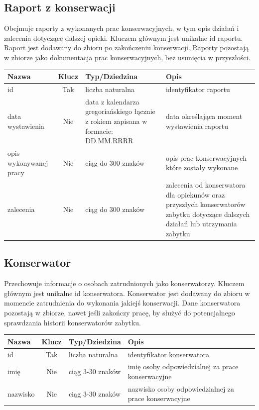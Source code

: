 \documentclass{article}
\begin{document}
\subsection*{Raport z konserwacji}
Obejmuje raporty z wykonanych prac konserwacyjnych, w tym opis działań i zalecenia dotyczące dalszej opieki. Kluczem głównym jest unikalne id raportu. Raport jest dodawany do zbioru po zakończeniu konserwacji. Raporty pozostają w zbiorze jako dokumentacja prac konserwacyjnych, bez usunięcia w przyszłości.   
\begin{longtable}{|C{3cm}|c|C{4.5cm}|C{5cm}|}
\hline
\textbf{Nazwa} & \textbf{Klucz} & \textbf{Typ/Dziedzina} & \textbf{Opis} \\ \hline
id & Tak & liczba naturalna & identyfikator raportu \\ \hline 
data wystawienia & Nie & data z kalendarza gregoriańskiego łącznie z rokiem zapisana w formacie: DD.MM.RRRR  & data określająca moment wystawienia raportu \\ \hline 
opis wykonywanej pracy & Nie & ciąg do 300 znaków & opis prac konserwacyjnych które zostały wykonane \\ \hline
zalecenia & Nie & ciąg do 300 znaków & zalecenia od konserwatora dla opiekunów oraz przyszłych konserwatorów zabytku dotyczące dalszych działań lub utrzymania zabytku \\ \hline
\end{longtable}

\subsection*{Konserwator}
Przechowuje informacje o osobach zatrudnionych jako konserwatorzy. Kluczem głównym jest unikalne id konserwatora. Konserwator jest dodawany do zbioru w momencie zatrudnienia do wykonania jakiejś konserwacji. Dane konserwatora pozostają w zbiorze, nawet jeśli zakończy pracę, by służyć do potencjalnego sprawdzania historii konserwatorów zabytku.
\begin{longtable}{|C{3cm}|c|C{4.5cm}|C{5cm}|}
\hline
\textbf{Nazwa} & \textbf{Klucz} & \textbf{Typ/Dziedzina} & \textbf{Opis} \\ \hline
id & Tak & liczba naturalna & identyfikator konserwatora \\ \hline 
imię & Nie & ciąg 3-30 znaków & imię osoby odpowiedzialnej za prace konserwacyjne \\ \hline
nazwisko & Nie & ciąg 3-30 znaków & nazwisko osoby odpowiedzialnej za prace konserwacyjne \\ \hline
\end{longtable}
\end{document}
